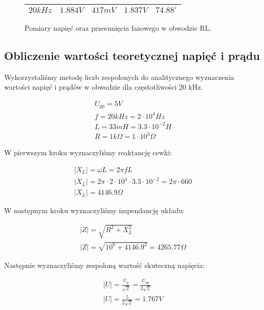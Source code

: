 \documentclass[polish,polish,a4paper]{article}
\begin{document}
\begin{figure}[H]
\begin{tabular}{|c|c|c|c|c|}
$20 kHz$                          & $1.884 V$                                                                       & $417 mV$                                                                  & $1.837 V$            & $74.88 ^{\circ}$                                                                                                                   \\ \hline
\end{tabular}
\caption{Pomiary napięć oraz przesunięcia fazowego w obwodzie RL.}
\end{figure}

\newpage
\subsection{Obliczenie wartości teoretycznej napięć i prądu}

Wykorzystaliśmy metodę liczb zespolonych do analitycznego wyznaczenia wartości napięć i prądów w obwodzie dla częstotliwości 20 kHz. 

\begin{gather}
U_{pp} = 5 V \\
f = 20 kHz = 2 \cdot 10^4 Hz \\ 
L = 33 mH = 3.3 \cdot 10^{-2} H \\
R = 1k\Omega = 1 \cdot 10^3 \Omega
\end{gather}

W pierwszym kroku wyznaczyliśmy reaktancję cewki: 

\begin{gather}
|X_L| = \omega L = 2 \pi f L \\
|X_L| = 2 \pi \cdot 2 \cdot 10^4 \cdot 3.3 \cdot 10^{-2} = 2 \pi \cdot 660 \\
|X_L| = 4146.9 \Omega
\end{gather}

W następnym kroku wyznaczyliśmy impendancję układu:

\begin{gather}
|Z| = \sqrt{R^2 + X_L^2} \\
|Z| = \sqrt{10^6 + 4146.9^2} = 4265.77 \Omega
\end{gather}

Następnie wyznaczyliśmy zespoloną wartość skuteczną napięcia: \cite{elektronika}

\begin{gather}
|U| = \frac{U_{p}}{\sqrt{2}} = \frac{U_{pp}}{2\sqrt{2}} \\
|U| = \frac{5}{2\sqrt{2}} = 1.767 V
\end{gather}
\end{document}
